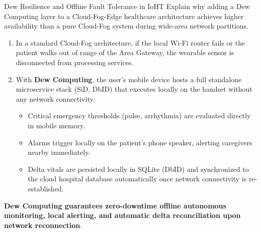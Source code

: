 \begin{solved}{Dew Resilience and Offline Fault Tolerance in IoHT}
\Given Explain why adding a Dew Computing layer to a Cloud-Fog-Edge healthcare architecture achieves higher availability than a pure Cloud-Fog system during wide-area network partitions.
\Steps
\begin{enumerate}[leftmargin=*]
  \item In a standard Cloud-Fog architecture, if the local Wi-Fi router fails or the patient walks out of range of the Area Gateway, the wearable sensor is disconnected from processing services.
  \item With \textbf{Dew Computing}, the user's mobile device hosts a full standalone microservice stack (SiD, DbID) that executes locally on the handset without any network connectivity:
    \begin{itemize}
      \item Critical emergency thresholds (pulse, arrhythmia) are evaluated directly in mobile memory.
      \item Alarms trigger locally on the patient's phone speaker, alerting caregivers nearby immediately.
      \item Delta vitals are persisted locally in SQLite (DbID) and synchronized to the cloud hospital database automatically once network connectivity is re-established.
    \end{itemize}
\end{enumerate}
\Answer \textbf{Dew Computing guarantees zero-downtime offline autonomous monitoring, local alerting, and automatic delta reconciliation upon network reconnection}.
\end{solved}

